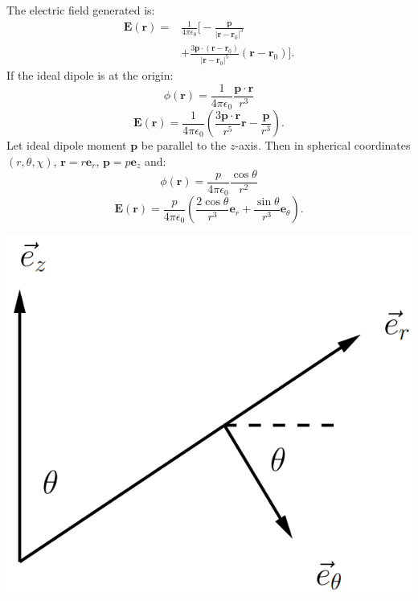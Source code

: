 \documentclass{article}
\newcommand{\vc}[1]{\boldsymbol{#1}}
\begin{document}
\begin{multicols*}{3}
The electric field generated is:
\begin{align*}
    \vc{E}(\vc{r})
    =&\frac{1}{4\pi\epsilon_0}\bigg[
    -\frac{\vc{p}}{|\vc{r}-\vc{r}_0|^3} \\
    &+\frac{3\vc{p}\cdot(\vc{r}-\vc{r}_0)}{|\vc{r}-\vc{r}_0|^5}
    (\vc{r}-\vc{r}_0)\bigg].
\end{align*}
If the ideal dipole is at the origin:
$$\phi(\vc{r})=\frac{1}{4\pi\epsilon_0}
\frac{\vc{p}\cdot\vc{r}}{r^3}$$
$$\vc{E}(\vc{r})=\frac{1}{4\pi\epsilon_0}
\left(\frac{3\vc{p}\cdot\vc{r}}{r^5}\vc{r}
-\frac{\vc{p}}{r^3}\right).$$
Let ideal dipole moment $\vc{p}$ be parallel to the $z$-axis.
Then in spherical coordinates $(r,\theta,\chi)$,
$\vc{r}=r\vc{e}_r$, $\vc{p}=p\vc{e}_z$ and:
$$\phi(\vc{r})=\frac{p}{4\pi\epsilon_0}\frac{\cos\theta}{r^2}$$
$$\vc{E}(\vc{r})=\frac{p}{4\pi\epsilon_0}\left(
\frac{2\cos\theta}{r^3}\vc{e}_r+\frac{\sin\theta}{r^3}
\vc{e}_{\theta}\right).$$
\begin{center}
    \includegraphics[scale=0.22]{f3.png}
\end{center}

\newcolumn


\end{multicols*}
\end{document}
